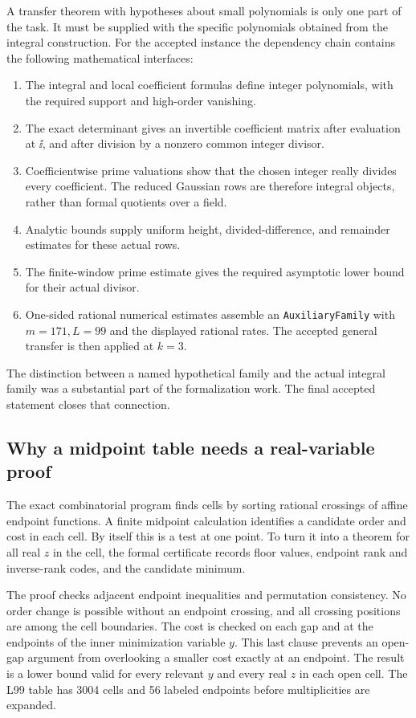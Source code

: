 A transfer theorem with hypotheses about small polynomials is only
one part of the task. It must be supplied with the specific
polynomials obtained from the integral construction. For the
accepted instance the dependency chain contains the following
mathematical interfaces:
\begin{enumerate}
\item The integral and local coefficient formulas define integer
polynomials, with the required support and high-order vanishing.
\item The exact determinant gives an invertible coefficient matrix
after evaluation at \(\ii\), and after division by a nonzero
common integer divisor.
\item Coefficientwise prime valuations show that the chosen integer
really divides every coefficient. The reduced Gaussian rows are
therefore integral objects, rather than formal quotients over a field.
\item Analytic bounds supply uniform height, divided-difference,
and remainder estimates for these actual rows.
\item The finite-window prime estimate gives the required
asymptotic lower bound for their actual divisor.
\item One-sided rational numerical estimates assemble an
\texttt{AuxiliaryFamily} with \(m=171,L=99\) and the displayed
rational rates. The accepted general transfer is then applied
at \(k=3\).
\end{enumerate}
The distinction between a named hypothetical family and the actual
integral family was a substantial part of the formalization work.
The final accepted statement closes that connection.

\subsection{Why a midpoint table needs a real-variable proof}

The exact combinatorial program finds cells by sorting rational
crossings of affine endpoint functions. A finite midpoint
calculation identifies a candidate order and cost in each cell.
By itself this is a test at one point. To turn it into a theorem
for all real \(z\) in the cell, the formal certificate records
floor values, endpoint rank and inverse-rank codes, and the
candidate minimum.

The proof checks adjacent endpoint inequalities and permutation
consistency. No order change is possible without an endpoint
crossing, and all crossing positions are among the cell boundaries.
The cost is checked on each gap and at the endpoints of the inner
minimization variable \(y\). This last clause prevents an open-gap
argument from overlooking a smaller cost exactly at an endpoint.
The result is a lower bound valid for every relevant \(y\) and
every real \(z\) in each open cell. The L99 table has 3004 cells
and 56 labeled endpoints before multiplicities are expanded.

